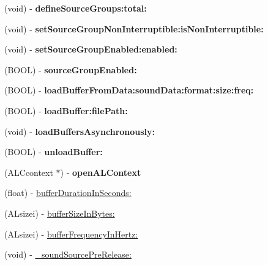 \begin{DoxyCompactItemize}
(void) -\/ {\bfseries define\+Source\+Groups\+:total\+:}
\item 
\mbox{\label{interfaceCDSoundEngine_afd29660acffd4fd1f7a667e4a389f84a}} 
(void) -\/ {\bfseries set\+Source\+Group\+Non\+Interruptible\+:is\+Non\+Interruptible\+:}
\item 
\mbox{\label{interfaceCDSoundEngine_ae791fe92a23a27d282fff5108ed8b8c0}} 
(void) -\/ {\bfseries set\+Source\+Group\+Enabled\+:enabled\+:}
\item 
\mbox{\label{interfaceCDSoundEngine_a9e73b1f9ce070579469e18da0fdabf5a}} 
(B\+O\+OL) -\/ {\bfseries source\+Group\+Enabled\+:}
\item 
\mbox{\label{interfaceCDSoundEngine_ad55fe00fbd360d99e3832047dc6f668c}} 
(B\+O\+OL) -\/ {\bfseries load\+Buffer\+From\+Data\+:sound\+Data\+:format\+:size\+:freq\+:}
\item 
\mbox{\label{interfaceCDSoundEngine_a6b28868545d700c3cc40d087527c6012}} 
(B\+O\+OL) -\/ {\bfseries load\+Buffer\+:file\+Path\+:}
\item 
\mbox{\label{interfaceCDSoundEngine_a8ab83905d8865c75c8055871f5c84fdd}} 
(void) -\/ {\bfseries load\+Buffers\+Asynchronously\+:}
\item 
\mbox{\label{interfaceCDSoundEngine_a2a245d09bd9aa88de752c97dd889662e}} 
(B\+O\+OL) -\/ {\bfseries unload\+Buffer\+:}
\item 
\mbox{\label{interfaceCDSoundEngine_a3207754d8ae7d5a63dc03fd43b698d12}} 
(A\+L\+Ccontext $\ast$) -\/ {\bfseries open\+A\+L\+Context}
\item 
(float) -\/ \hyperlink{interfaceCDSoundEngine_a5731f4ec2052eb323ba1777f72c9da8c}{buffer\+Duration\+In\+Seconds\+:}
\item 
(A\+Lsizei) -\/ \hyperlink{interfaceCDSoundEngine_a91672bece24f10760d62cce27986573e}{buffer\+Size\+In\+Bytes\+:}
\item 
(A\+Lsizei) -\/ \hyperlink{interfaceCDSoundEngine_af8559b48f34ad22ba9a7cf27ffcb8648}{buffer\+Frequency\+In\+Hertz\+:}
\item 
(void) -\/ \hyperlink{interfaceCDSoundEngine_ad05b4a121e37fe36d3df453989be82af}{\+\_\+sound\+Source\+Pre\+Release\+:}
\end{DoxyCompactItemize}
